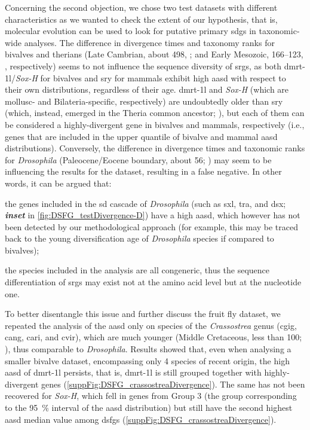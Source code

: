 Concerning the second objection, we chose two test datasets with different characteristics as we wanted to check the extent of our hypothesis, that is, molecular evolution can be used to look for putative primary \glspl{sdg} in taxonomic-wide analyses. The difference in divergence times and taxonomy ranks for bivalves and therians (Late Cambrian, about \qty{498}{\mya}, ; and Early Mesozoic, \qtyrange{166}{123}{\mya}, , respectively) seems to not influence the sequence diversity of \glspl{srg}, as both \gls{dmrt-1l}/\textit{Sox-H} for bivalves and \gls{sry} for mammals exhibit high \gls{aasd} with respect to their own distributions, regardless of their age. \gls{dmrt-1l} and \textit{Sox-H} (which are mollusc- and Bilateria-specific, respectively) are undoubtedly older than \gls{sry} (which, instead, emerged in the Theria common ancestor; ), but each of them can be considered a highly-divergent gene in bivalves and mammals, respectively (i.e., genes that are included in the \fivepercent{} upper quantile of bivalve and mammal \gls{aasd} distributions). Conversely, the difference in divergence times and taxonomic ranks for \textit{Drosophila} (Paleocene/Eocene boundary, about \qty{56}{\mya}; ) may seem to be influencing the results for the dataset, resulting in a false negative. In other words, it can be argued that:
\begin{inlinelist}
	\item the genes included in the \gls{sd} cascade of \textit{Drosophila} (such as \gls{sxl}, \gls{tra}, and \gls{dsx}; \textbf{\textit{inset}} in \cref{fig:DSFG_testDivergence-D}) have a high \gls{aasd}, which however has not been detected by our methodological approach (for example, this may be traced back to the young diversification age of \textit{Drosophila} species if compared to bivalves);
	\item the species included in the analysis are all congeneric, thus the sequence differentiation of \glspl{srg} may exist not at the amino acid level but at the nucleotide one. 
\end{inlinelist}
To better disentangle this issue and further discuss the fruit fly dataset, we repeated the analysis of the \gls{aasd} only on species of the \textit{Crassostrea} genus (\gls{cgig}, \gls{cang}, \gls{cari}, and \gls{cvir}), which are much younger (Middle Cretaceous, less than \qty{100}{\mya}; ), thus comparable to \textit{Drosophila}. Results showed that, even when analysing a smaller bivalve dataset, encompassing only 4 species of recent origin, the high \gls{aasd} of \gls{dmrt-1l} persists, that is, \gls{dmrt-1l} is still grouped together with highly-divergent genes (\cref{suppFig:DSFG_crassostreaDivergence}). The same has not been recovered for \textit{Sox-H}, which fell in genes from Group 3 (the group corresponding to the \qty{95}{\percent} interval of the \gls{aasd} distribution) but still have the second highest \gls{aasd} median value among \glspl{dsfg} (\cref{suppFig:DSFG_crassostreaDivergence}).

